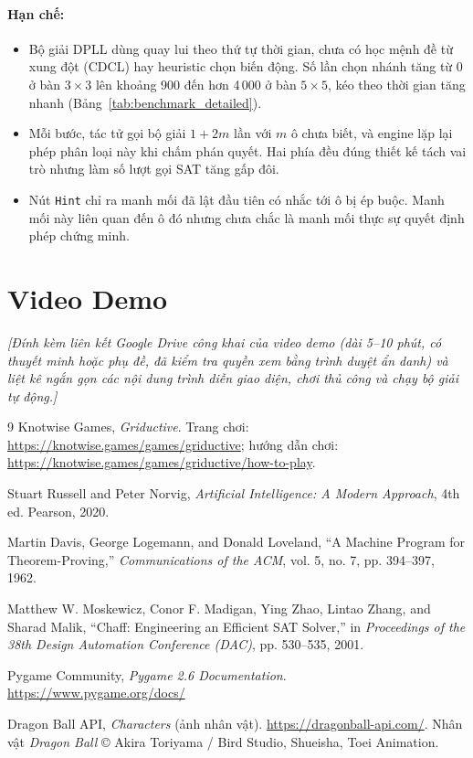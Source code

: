 \documentclass[12pt,a4paper]{article}
\begin{document}
    \paragraph{Hạn chế:}
    \begin{itemize}
        \item Bộ giải DPLL dùng quay lui theo thứ tự thời gian, chưa có học mệnh đề từ xung đột (CDCL) hay heuristic chọn biến động. Số lần chọn nhánh tăng từ $0$ ở bàn $3\times3$ lên khoảng 900 đến hơn 4\,000 ở bàn $5\times5$, kéo theo thời gian tăng nhanh (Bảng~\ref{tab:benchmark_detailed}).
        \item Mỗi bước, tác tử gọi bộ giải $1 + 2m$ lần với $m$ ô chưa biết, và engine lặp lại phép phân loại này khi chấm phán quyết. Hai phía đều đúng thiết kế tách vai trò nhưng làm số lượt gọi SAT tăng gấp đôi.
        \item Nút \texttt{Hint} chỉ ra manh mối đã lật đầu tiên có nhắc tới ô bị ép buộc. Manh mối này liên quan đến ô đó nhưng chưa chắc là manh mối thực sự quyết định phép chứng minh.
    \end{itemize}

    \section{Video Demo}
    \textit{[Đính kèm liên kết Google Drive công khai của video demo (dài 5--10 phút, có thuyết minh hoặc phụ đề, đã kiểm tra quyền xem bằng trình duyệt ẩn danh) và liệt kê ngắn gọn các nội dung trình diễn giao diện, chơi thủ công và chạy bộ giải tự động.]}

    \begin{thebibliography}{9}
    Knotwise Games, \emph{Griductive}. Trang chơi: \url{https://knotwise.games/games/griductive}; hướng dẫn chơi: \url{https://knotwise.games/games/griductive/how-to-play}.

    Stuart Russell and Peter Norvig, \emph{Artificial Intelligence: A Modern Approach}, 4th ed. Pearson, 2020.

    Martin Davis, George Logemann, and Donald Loveland, ``A Machine Program for Theorem-Proving,'' \emph{Communications of the ACM}, vol. 5, no. 7, pp. 394--397, 1962.

    Matthew W. Moskewicz, Conor F. Madigan, Ying Zhao, Lintao Zhang, and Sharad Malik, ``Chaff: Engineering an Efficient SAT Solver,'' in \emph{Proceedings of the 38th Design Automation Conference (DAC)}, pp. 530--535, 2001.

    Pygame Community, \emph{Pygame 2.6 Documentation}. \url{https://www.pygame.org/docs/}

    Dragon Ball API, \emph{Characters} (ảnh nhân vật). \url{https://dragonball-api.com/}. Nhân vật \emph{Dragon Ball} \copyright{} Akira Toriyama / Bird Studio, Shueisha, Toei Animation.
    \end{thebibliography}
\end{document}
